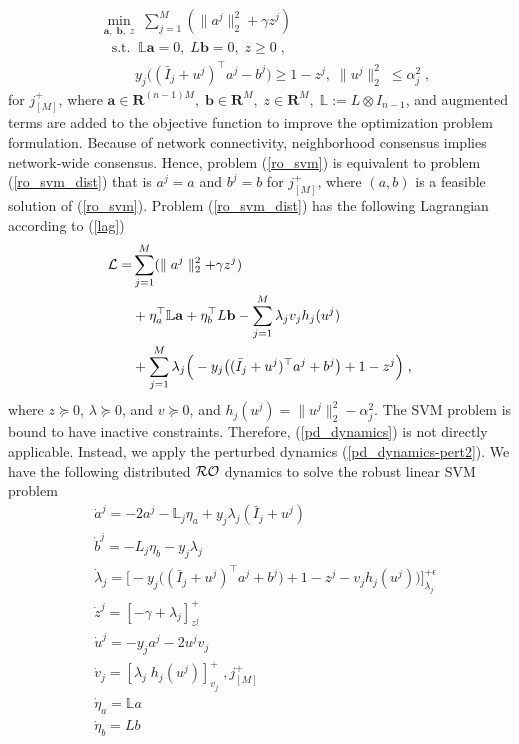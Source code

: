\documentclass[journal,twoside,web]{ieeecolor}
\begin{document}
\begin{align} \label{ro_svm_dist}
&\min_{\mathbf{a},\;\mathbf{b},\;z} \; \sum_{j=1}^M (\parallel a^j \parallel_2^2+\gamma z^j)\\%
&\;\;\; \text{s.t.}\;\;\mathbb{L} \mathbf{a}=0,\;{L} \mathbf{b}=0,\;z \geq 0\;,\nonumber\\
&\;\;\;\;\;\;\;\;\; y_j\big((\bar I_j+u^j)^\top a^j-b^j\big) \geq 1-z^j,\;\parallel u^j \parallel_2^2 \; \leq \alpha_j^2\;,\nonumber 
\end{align}
for $j^+_{[M]}$, where $\mathbf{a} \in \mathbf{R}^{(n-1)M},\;\mathbf{b} \in \mathbf{R}^{M},\;z \in \mathbf{R}^{M},\; \mathbb{L}:=L\otimes I_{n-1}$,\; %
and augmented terms are added to the objective function to improve the optimization problem formulation. Because of network connectivity, neighborhood consensus implies network-wide consensus. Hence, problem (\ref{ro_svm}) is equivalent to problem (\ref{ro_svm_dist}) that is $a^j=a$ and $b^j=b$ for $j^+_{[M]}$, where $(a,b)$ is a feasible solution of (\ref{ro_svm}). Problem (\ref{ro_svm_dist})
has the following Lagrangian according to (\ref{lag})
\begin{align} \label{lagrangian_compact_svm}
{\cal L}=& \sum_{j=1}^M (\parallel a^j \parallel_2^2+\gamma z^j)\nonumber\\%
&+\eta_a^\top \mathbb{L} \mathbf{a}+\eta_b^\top {L} \mathbf{b}-\sum_{j=1}^{M} \lambda_j v_j h_j(u^j)\nonumber\\&+  \sum_{j=1}^{M} \lambda_j \Big(-y_j \big((\bar I_j+u^j)^\top a^j+b^j\big)+1-z^j\Big)\;,
\end{align}
where $z \succeq 0$, $\lambda \succeq 0$, and $v \succeq 0$, and $h_j(u^j)=\parallel u^j \parallel_2^2-\alpha_j^2$\;.
The SVM problem is bound to have inactive constraints. Therefore, (\ref{pd_dynamics}) is not directly applicable. Instead, we apply the perturbed dynamics (\ref{pd_dynamics-pert2}).
We have the following distributed ${\cal RO}$ dynamics to solve the robust linear SVM problem
\begin{align} \label{ro_svm_dynamics}
&\dot a^j=-2 a^j-\mathbb{L}_j \eta_a+y_j \lambda_j (\bar I_j+u^j)\nonumber\\
&\dot b^j=-{L}_j \eta_b-y_j \lambda_j\nonumber\\
&\dot \lambda_j=\big[-y_j \big((\bar I_j+u^j)^\top a^j+b^j\big)+1-z^j-v_j h_j(u^j))\big]_{\lambda_j}^{+\epsilon}\nonumber\\
&\dot z^j=\left[-\gamma+\lambda_j\right]_{z^j}^+\\
&\dot u^j=-y_j a^j-2u^j v_j\nonumber\\
&\dot v_j=\left[\lambda_j \; h_j(u^j) \right]_{v_j}^+\;,j^+_{[M]}\nonumber\\
&\dot \eta_a=\mathbb{L} a\nonumber\\
&\dot \eta_b={L} b\nonumber
\end{align}
\end{document}
